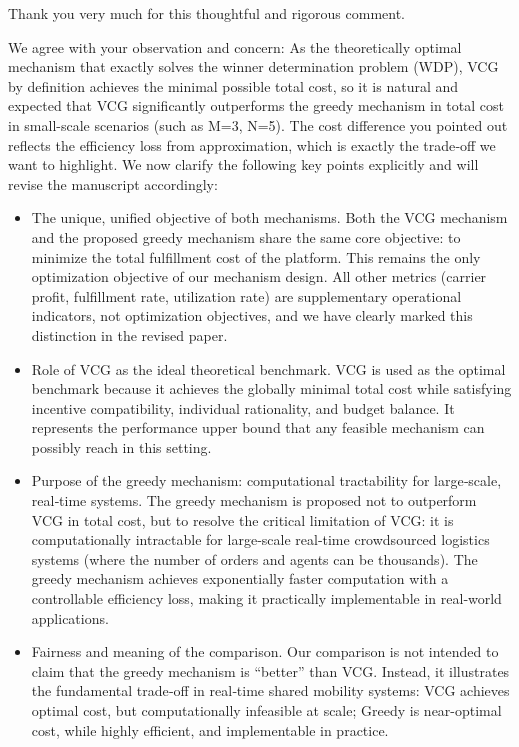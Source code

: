 \begin{revresponse}[1.3.1]
	Thank you very much for this thoughtful and rigorous comment. 
    
    We agree with your observation and concern: As the theoretically optimal mechanism that exactly solves the winner determination problem (WDP), VCG by definition achieves the minimal possible total cost, so it is natural and expected that VCG significantly outperforms the greedy mechanism in total cost in small-scale scenarios (such as M=3, N=5). The cost difference you pointed out reflects the efficiency loss from approximation, which is exactly the trade‑off we want to highlight. We now clarify the following key points explicitly and will revise the manuscript accordingly: 
    \begin{itemize}
        \item The unique, unified objective of both mechanisms. Both the VCG mechanism and the proposed greedy mechanism share the same core objective: to minimize the total fulfillment cost of the platform. This remains the only optimization objective of our mechanism design. All other metrics (carrier profit, fulfillment rate, utilization rate) are supplementary operational indicators, not optimization objectives, and we have clearly marked this distinction in the revised paper. 
        \item Role of VCG as the ideal theoretical benchmark. VCG is used as the optimal benchmark because it achieves the globally minimal total cost while satisfying incentive compatibility, individual rationality, and budget balance. It represents the performance upper bound that any feasible mechanism can possibly reach in this setting.
        \item Purpose of the greedy mechanism: computational tractability for large‑scale, real‑time systems. The greedy mechanism is proposed not to outperform VCG in total cost, but to resolve the critical limitation of VCG: it is computationally intractable for large‑scale real‑time crowdsourced logistics systems (where the number of orders and agents can be thousands). The greedy mechanism achieves exponentially faster computation with a controllable efficiency loss, making it practically implementable in real‑world applications.
        \item Fairness and meaning of the comparison. Our comparison is not intended to claim that the greedy mechanism is ``better'' than VCG. Instead, it illustrates the fundamental trade‑off in real‑time shared mobility systems: VCG achieves optimal cost, but computationally infeasible at scale; Greedy is near-optimal cost, while highly efficient, and implementable in practice. 
    \end{itemize}
    

\end{revresponse}
